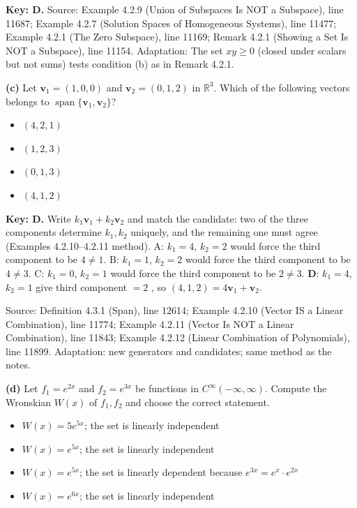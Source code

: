 \documentclass[11pt,a4paper]{article}
\newcommand{\Src}[1]{{\footnotesize\color{black!65}Source: #1}}
\begin{document}
\textbf{Key: D.} \Src{Example 4.2.9 (Union of Subspaces Is NOT a Subspace), line 11687; Example 4.2.7 (Solution Spaces of Homogeneous Systems), line 11477; Example 4.2.1 (The Zero Subspace), line 11169; Remark 4.2.1 (Showing a Set Is NOT a Subspace), line 11154. Adaptation: The set $xy\ge0$ (closed under scalars but not sums) tests condition (b) as in Remark 4.2.1.}\par
{}\textbf{(c)} Let $\mathbf{v}_1=(1,0,0)$ and $\mathbf{v}_2=(0,1,2)$ in $\mathbb{R}^3$. Which of the following vectors belongs to $\operatorname{span}\{\mathbf{v}_1,\mathbf{v}_2\}$?\par
\begin{itemize}[leftmargin=8mm,itemsep=0pt]\item[A] $(4,2,1)$\item[B] $(1,2,3)$\item[C] $(0,1,3)$\item[D$^{\ast}$] $(4,1,2)$\end{itemize}
\textbf{Key: D.} Write $k_1\mathbf{v}_1+k_2\mathbf{v}_2$ and match the candidate: two of the three components determine $k_1,k_2$ uniquely, and the remaining one must agree (Examples 4.2.10--4.2.11 method). A: $k_1=4$, $k_2=2$ would force the third component to be $4\neq1$. B: $k_1=1$, $k_2=2$ would force the third component to be $4\neq3$. C: $k_1=0$, $k_2=1$ would force the third component to be $2\neq3$. \textbf{D}: $k_1=4$, $k_2=1$ give third component $=2$ \checkmark, so $(4,1,2)=4\mathbf{v}_1+\mathbf{v}_2$.\par
\Src{Definition 4.3.1 (Span), line 12614; Example 4.2.10 (Vector IS a Linear Combination), line 11774; Example 4.2.11 (Vector Is NOT a Linear Combination), line 11843; Example 4.2.12 (Linear Combination of Polynomials), line 11899. Adaptation: new generators and candidates; same method as the notes.}\par
{}\textbf{(d)} Let $f_1=e^{2x}$ and $f_2=e^{3x}$ be functions in $C^{\infty}(-\infty,\infty)$. Compute the Wronskian $W(x)$ of $f_1,f_2$ and choose the correct statement.\par
\begin{itemize}[leftmargin=8mm,itemsep=0pt]\item[A] $W(x)=5e^{5x}$; the set is linearly independent\item[B$^{\ast}$] $W(x)=e^{5x}$; the set is linearly independent\item[C] $W(x)=e^{5x}$; the set is linearly dependent because $e^{3x}=e^{x}\cdot e^{2x}$\item[D] $W(x)=e^{6x}$; the set is linearly independent\end{itemize}
\end{document}

